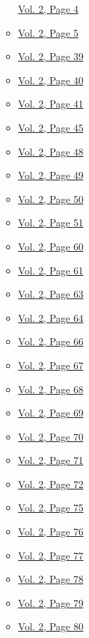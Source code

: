 \begin{itemize}
\begin{itemize}
    \protect\hyperlink{g-page-216}{Vol. 2, Page 4}
  \item
    \protect\hyperlink{g-page-217}{Vol. 2, Page 5}
  \item
    \protect\hyperlink{g-page-251}{Vol. 2, Page 39}
  \item
    \protect\hyperlink{g-page-252}{Vol. 2, Page 40}
  \item
    \protect\hyperlink{g-page-253}{Vol. 2, Page 41}
  \item
    \protect\hyperlink{g-page-257}{Vol. 2, Page 45}
  \item
    \protect\hyperlink{g-page-260}{Vol. 2, Page 48}
  \item
    \protect\hyperlink{g-page-261}{Vol. 2, Page 49}
  \item
    \protect\hyperlink{g-page-262}{Vol. 2, Page 50}
  \item
    \protect\hyperlink{g-page-263}{Vol. 2, Page 51}
  \item
    \protect\hyperlink{g-page-272}{Vol. 2, Page 60}
  \item
    \protect\hyperlink{g-page-273}{Vol. 2, Page 61}
  \item
    \protect\hyperlink{g-page-275}{Vol. 2, Page 63}
  \item
    \protect\hyperlink{g-page-276}{Vol. 2, Page 64}
  \item
    \protect\hyperlink{g-page-278}{Vol. 2, Page 66}
  \item
    \protect\hyperlink{g-page-279}{Vol. 2, Page 67}
  \item
    \protect\hyperlink{g-page-280}{Vol. 2, Page 68}
  \item
    \protect\hyperlink{g-page-281}{Vol. 2, Page 69}
  \item
    \protect\hyperlink{g-page-282}{Vol. 2, Page 70}
  \item
    \protect\hyperlink{g-page-283}{Vol. 2, Page 71}
  \item
    \protect\hyperlink{g-page-284}{Vol. 2, Page 72}
  \item
    \protect\hyperlink{g-page-287}{Vol. 2, Page 75}
  \item
    \protect\hyperlink{g-page-288}{Vol. 2, Page 76}
  \item
    \protect\hyperlink{g-page-289}{Vol. 2, Page 77}
  \item
    \protect\hyperlink{g-page-290}{Vol. 2, Page 78}
  \item
    \protect\hyperlink{g-page-291}{Vol. 2, Page 79}
  \item
    \protect\hyperlink{g-page-292}{Vol. 2, Page 80}

\end{itemize}
\end{itemize}

